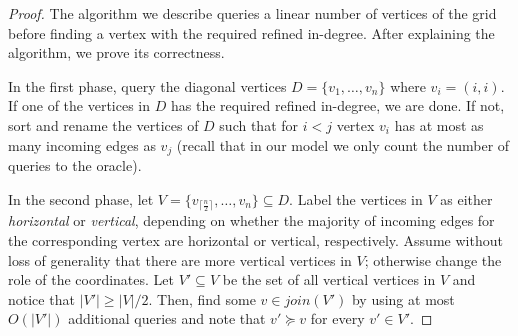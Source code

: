 \documentclass[runningheads,a4paper]{llncs}
\newcommand{\indegree}{refined in-degree\xspace}
\begin{document}
\begin{proof}
The algorithm we describe queries a linear number of vertices of the grid before finding a vertex with the required \indegree. 
After explaining the algorithm, we prove its correctness.

In the first phase, query the diagonal vertices $D = \{v_1,\ldots, v_n\}$ where $v_i = (i,i)$.
If one of the vertices in $D$ has the required \indegree, we are done. 
If not, sort and rename the vertices of $D$ such that for $i < j$ vertex $v_i$ has at most as many incoming edges as $v_j$ (recall that in our model we only count the number of queries to the oracle). 

In the second phase, let $V = \{v_{\lceil \frac{n}{2} \rceil},\ldots,v_n\} \subseteq D$.
Label the vertices in $V$ as either \emph{horizontal}  or \emph{vertical}, depending on whether the majority of incoming edges for the corresponding vertex are horizontal  or vertical, respectively. 
Assume without loss of generality that there are more vertical vertices in $V$; otherwise change the role of the coordinates. 
Let $V' \subseteq V$ be the set of all vertical vertices in $V$ and notice that $|V'| \geq |V|/2$.
Then, find some $v \in join(V')$ by using at most $O(|V'|)$ additional queries and note that $v' \succeq v$ for every $v' \in V'$.




\end{proof}
\end{document}
